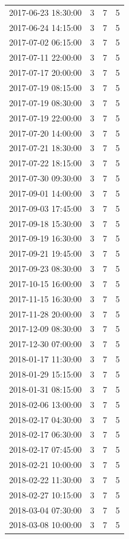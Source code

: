 \begin{tabular}{lrrr}
2017-06-23 18:30:00 & 3 & 7 & 5 \\
2017-06-24 14:15:00 & 3 & 7 & 5 \\
2017-07-02 06:15:00 & 3 & 7 & 5 \\
2017-07-11 22:00:00 & 3 & 7 & 5 \\
2017-07-17 20:00:00 & 3 & 7 & 5 \\
2017-07-19 08:15:00 & 3 & 7 & 5 \\
2017-07-19 08:30:00 & 3 & 7 & 5 \\
2017-07-19 22:00:00 & 3 & 7 & 5 \\
2017-07-20 14:00:00 & 3 & 7 & 5 \\
2017-07-21 18:30:00 & 3 & 7 & 5 \\
2017-07-22 18:15:00 & 3 & 7 & 5 \\
2017-07-30 09:30:00 & 3 & 7 & 5 \\
2017-09-01 14:00:00 & 3 & 7 & 5 \\
2017-09-03 17:45:00 & 3 & 7 & 5 \\
2017-09-18 15:30:00 & 3 & 7 & 5 \\
2017-09-19 16:30:00 & 3 & 7 & 5 \\
2017-09-21 19:45:00 & 3 & 7 & 5 \\
2017-09-23 08:30:00 & 3 & 7 & 5 \\
2017-10-15 16:00:00 & 3 & 7 & 5 \\
2017-11-15 16:30:00 & 3 & 7 & 5 \\
2017-11-28 20:00:00 & 3 & 7 & 5 \\
2017-12-09 08:30:00 & 3 & 7 & 5 \\
2017-12-30 07:00:00 & 3 & 7 & 5 \\
2018-01-17 11:30:00 & 3 & 7 & 5 \\
2018-01-29 15:15:00 & 3 & 7 & 5 \\
2018-01-31 08:15:00 & 3 & 7 & 5 \\
2018-02-06 13:00:00 & 3 & 7 & 5 \\
2018-02-17 04:30:00 & 3 & 7 & 5 \\
2018-02-17 06:30:00 & 3 & 7 & 5 \\
2018-02-17 07:45:00 & 3 & 7 & 5 \\
2018-02-21 10:00:00 & 3 & 7 & 5 \\
2018-02-22 11:30:00 & 3 & 7 & 5 \\
2018-02-27 10:15:00 & 3 & 7 & 5 \\
2018-03-04 07:30:00 & 3 & 7 & 5 \\
2018-03-08 10:00:00 & 3 & 7 & 5 \\

\end{tabular}
